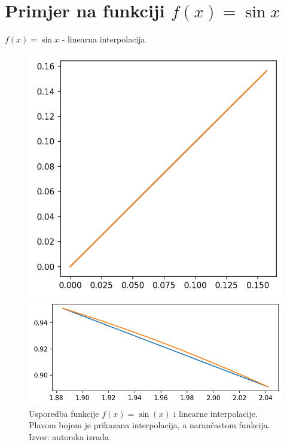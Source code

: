 \documentclass[10pt]{beamer}
\begin{document}
\section{Primjer na funkciji $f(x)=\sin x$}
\begin{frame}{$f(x)=\sin x$ - linearna interpolacija}
	
	\begin{figure}[H]
		\centering
		\begin{minipage}{.5\textwidth}
			\centering
			\includegraphics[width=\textwidth]{slike/usporedba40.png}
		\end{minipage}%
		\begin{minipage}{.5\textwidth}
			\centering
			\includegraphics[width=\textwidth]{slike/usporedba412.png}
		\end{minipage}
		\caption{Usporedba funkcije $f(x)=\sin (x)$ i linearne interpolacije. Plavom bojom je prikazana interpolacija, a narančastom funkcija. Izvor: autorska izrada}
		\label{linInterSlika1}
	\end{figure}
	
\end{frame}
\end{document}

